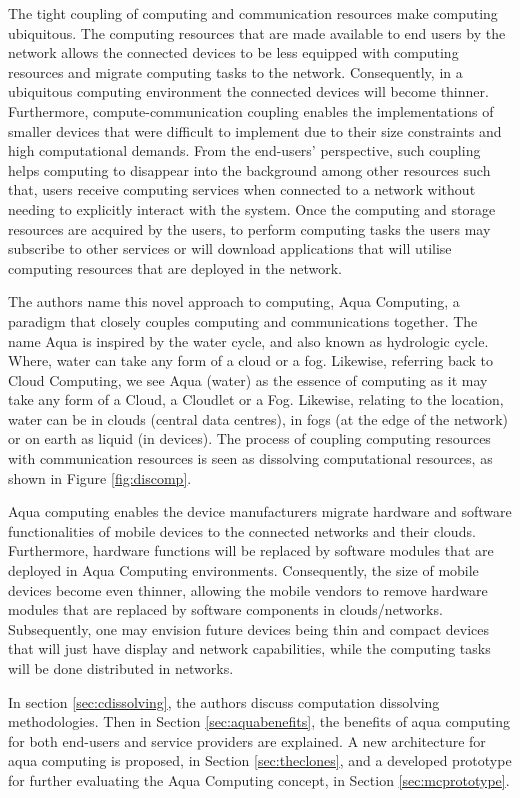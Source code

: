 \documentclass[12pt,journal,compsoc, onecolumn]{IEEEtran}
\begin{document}
The tight coupling of computing and communication resources make computing ubiquitous. The computing resources that are made available to end users by the network allows the connected devices to be less equipped with computing resources and migrate computing tasks to the network. Consequently, in a ubiquitous computing environment the connected devices will become thinner. Furthermore, compute-communication coupling enables the implementations of smaller devices that were difficult to implement due to their size constraints and high computational demands. From the end-users' perspective, such coupling helps computing to disappear into the background among other resources such that, users receive computing services when connected to a network without needing to explicitly interact with the system. Once the computing and storage resources are acquired by the users, to perform computing tasks the users may subscribe to other services or will download applications that will utilise computing resources that are deployed in the network.

The authors name this novel approach to computing, Aqua Computing, a paradigm that closely couples computing and communications together. The name Aqua is inspired by the water cycle, and also known as hydrologic cycle. Where, water can take any form of a cloud or a fog. Likewise, referring back to Cloud Computing, we see Aqua (water) as the essence of computing as it may take any form of a Cloud, a Cloudlet or a Fog. Likewise, relating to the location, water can be in clouds (central data centres), in fogs (at the edge of the network) or on earth as liquid (in devices).  The process of coupling computing resources with communication resources is seen as dissolving computational resources, as shown in Figure \ref{fig:discomp}. 
 
Aqua computing enables the device manufacturers migrate hardware and software functionalities of mobile devices to the connected networks and their clouds. Furthermore, hardware functions will be replaced by software modules that are deployed in Aqua Computing environments. Consequently, the size of mobile devices become even thinner, allowing the mobile vendors to remove hardware modules that are replaced by software components in clouds/networks. Subsequently, one may envision future devices being thin and compact devices that will just have display and network capabilities, while the computing tasks will be done distributed in networks.

In section \ref{sec:cdissolving}, the authors discuss computation dissolving methodologies. Then in Section \ref{sec:aquabenefits}, the benefits of aqua computing for both end-users and service providers are explained. A new architecture for aqua computing is proposed, in Section \ref{sec:theclones}, and a developed prototype for further evaluating the Aqua Computing concept, in Section \ref{sec:mcprototype}.
 
\end{document}
